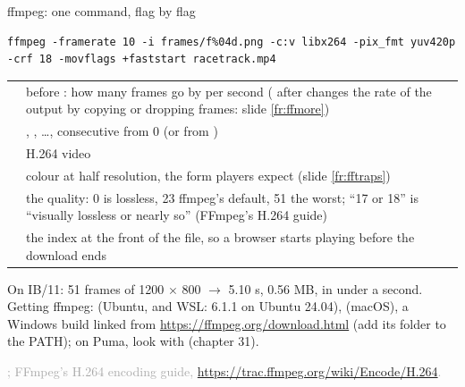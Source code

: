 \documentclass[aspectratio=169,11pt]{beamer}
\newcommand{\sourcecredit}[1]{\vfill\begin{flushright}\tiny\textcolor{DarkGray}{#1}\end{flushright}}
\begin{document}
\begin{frame}[fragile]{ffmpeg: one command, flag by flag}
\label{fr:ffmpeg}
\begin{lstlisting}[style=shell]
ffmpeg -framerate 10 -i frames/f%04d.png -c:v libx264 -pix_fmt yuv420p -crf 18 -movflags +faststart racetrack.mp4
\end{lstlisting}
\footnotesize
\begin{tabular}{@{}L{0.25\textwidth}L{0.71\textwidth}@{}}
\toprule
{} & before : how many frames go by per second ( after  changes the rate of the output by copying or dropping frames: slide \ref{fr:ffmore}) \\
 & , , \dots, consecutive from 0 (or from ) \\
 & H.264 video \\
 & colour at half resolution, the form players expect (slide \ref{fr:fftraps}) \\
 & the quality: 0 is lossless, 23 ffmpeg's default, 51 the worst; ``17 or 18'' is ``visually lossless or nearly so'' (FFmpeg's H.264 guide) \\
 & the index at the front of the file, so a browser starts playing before the download ends \\
\bottomrule
\end{tabular}

\vspace{1mm}
On IB/11: 51 frames of 1200 $\times$ 800 $\to$ 5.10 s, 0.56 MB, in under a second. Getting ffmpeg:  (Ubuntu, and WSL: 6.1.1 on Ubuntu 24.04),  (macOS), a Windows build linked from \url{https://ffmpeg.org/download.html} (add its  folder to the PATH); on Puma, look with  (chapter 31).
\sourcecredit{; FFmpeg's H.264 encoding guide, \url{https://trac.ffmpeg.org/wiki/Encode/H.264}.}
\end{frame}
\end{document}
